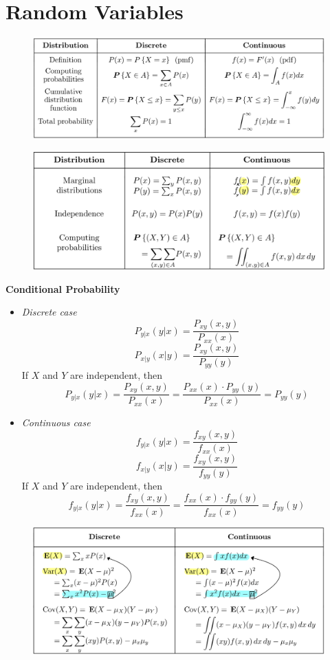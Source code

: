 \chapter{Random Variables}

\begin{figure}[h]
\begin{center}
\includegraphics[width=1\linewidth]{images/pmf_cdf.jpeg}
\end{center}
\end{figure}

\begin{figure}[h]
\begin{center}
\includegraphics[width=1\linewidth]{images/marginal.jpeg}
\end{center}
\end{figure}

\textbf{Conditional Probability}
\begin{itemize}
    \item \textit{Discrete case}
    $$P_{y|x}(y|x) = \frac{P_{xy}(x,y)}{P_{xx}(x)}$$
    $$P_{x|y}(x|y) = \frac{P_{xy}(x,y)}{P_{yy}(y)}$$
    If $X$ and $Y$ are independent, then
    $$P_{y|x}(y|x) = \frac{P_{xy}(x,y)}{P_{xx}(x)} = \frac{P_{xx}(x) \cdot P_{yy}(y)}{P_{xx}(x)} = P_{yy}(y)$$
    \item \textit{Continuous case}
    $$f_{y|x}(y|x) = \frac{f_{xy}(x,y)}{f_{xx}(x)}$$
    $$f_{x|y}(x|y) = \frac{f_{xy}(x,y)}{f_{yy}(y)}$$
    If $X$ and $Y$ are independent, then
    $$f_{y|x}(y|x) = \frac{f_{xy}(x,y)}{f_{xx}(x)} = \frac{f_{xx}(x) \cdot f_{yy}(y)}{f_{xx}(x)} = f_{yy}(y)$$
\end{itemize}

\begin{figure}[h]
\begin{center}
\includegraphics[width=1\linewidth]{images/e_var_cov.jpeg}
\end{center}
\end{figure}